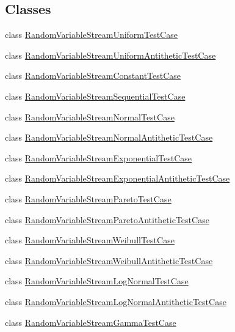 \subsection*{Classes}
\begin{DoxyCompactItemize}
\item 
class \hyperlink{classRandomVariableStreamUniformTestCase}{Random\+Variable\+Stream\+Uniform\+Test\+Case}
\item 
class \hyperlink{classRandomVariableStreamUniformAntitheticTestCase}{Random\+Variable\+Stream\+Uniform\+Antithetic\+Test\+Case}
\item 
class \hyperlink{classRandomVariableStreamConstantTestCase}{Random\+Variable\+Stream\+Constant\+Test\+Case}
\item 
class \hyperlink{classRandomVariableStreamSequentialTestCase}{Random\+Variable\+Stream\+Sequential\+Test\+Case}
\item 
class \hyperlink{classRandomVariableStreamNormalTestCase}{Random\+Variable\+Stream\+Normal\+Test\+Case}
\item 
class \hyperlink{classRandomVariableStreamNormalAntitheticTestCase}{Random\+Variable\+Stream\+Normal\+Antithetic\+Test\+Case}
\item 
class \hyperlink{classRandomVariableStreamExponentialTestCase}{Random\+Variable\+Stream\+Exponential\+Test\+Case}
\item 
class \hyperlink{classRandomVariableStreamExponentialAntitheticTestCase}{Random\+Variable\+Stream\+Exponential\+Antithetic\+Test\+Case}
\item 
class \hyperlink{classRandomVariableStreamParetoTestCase}{Random\+Variable\+Stream\+Pareto\+Test\+Case}
\item 
class \hyperlink{classRandomVariableStreamParetoAntitheticTestCase}{Random\+Variable\+Stream\+Pareto\+Antithetic\+Test\+Case}
\item 
class \hyperlink{classRandomVariableStreamWeibullTestCase}{Random\+Variable\+Stream\+Weibull\+Test\+Case}
\item 
class \hyperlink{classRandomVariableStreamWeibullAntitheticTestCase}{Random\+Variable\+Stream\+Weibull\+Antithetic\+Test\+Case}
\item 
class \hyperlink{classRandomVariableStreamLogNormalTestCase}{Random\+Variable\+Stream\+Log\+Normal\+Test\+Case}
\item 
class \hyperlink{classRandomVariableStreamLogNormalAntitheticTestCase}{Random\+Variable\+Stream\+Log\+Normal\+Antithetic\+Test\+Case}
\item 
class \hyperlink{classRandomVariableStreamGammaTestCase}{Random\+Variable\+Stream\+Gamma\+Test\+Case}

\end{DoxyCompactItemize}
